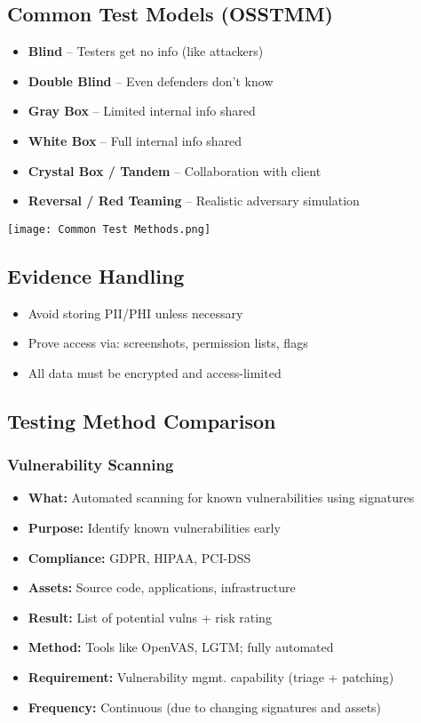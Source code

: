 \subsection{Common Test Models (OSSTMM)}
{
\begin{itemize}[noitemsep]
  \item \textbf{Blind} – Testers get no info (like attackers)
  \item \textbf{Double Blind} – Even defenders don’t know
  \item \textbf{Gray Box} – Limited internal info shared
  \item \textbf{White Box} – Full internal info shared
  \item \textbf{Crystal Box / Tandem} – Collaboration with client
  \item \textbf{Reversal / Red Teaming} – Realistic adversary simulation
\end{itemize}
}
\begin{center}
\texttt{[image: Common Test Methods.png]}
\end{center}

\subsection{Evidence Handling}
{
\begin{itemize}[noitemsep]
  \item Avoid storing PII/PHI unless necessary
  \item Prove access via: screenshots, permission lists, flags
  \item All data must be encrypted and access-limited
\end{itemize}
}

\subsection{Testing Method Comparison}

\subsubsection{Vulnerability Scanning}
\begin{itemize}[noitemsep]
  \item \textbf{What:} Automated scanning for known vulnerabilities using signatures
  \item \textbf{Purpose:} Identify known vulnerabilities early
  \item \textbf{Compliance:} GDPR, HIPAA, PCI-DSS
  \item \textbf{Assets:} Source code, applications, infrastructure
  \item \textbf{Result:} List of potential vulns + risk rating
  \item \textbf{Method:} Tools like OpenVAS, LGTM; fully automated
  \item \textbf{Requirement:} Vulnerability mgmt. capability (triage + patching)
  \item \textbf{Frequency:} Continuous (due to changing signatures and assets)
\end{itemize}

